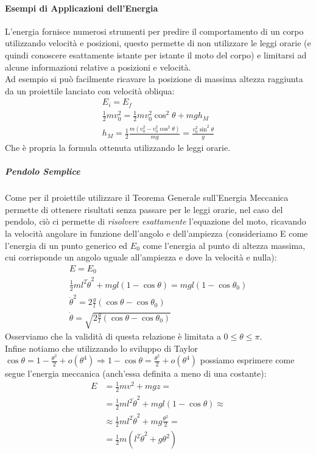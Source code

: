 \documentclass{report}
\newcommand{\then}{\ensuremath{\Rightarrow}}
\begin{document}
\paragraph{Esempi di Applicazioni dell'Energia}
L'energia fornisce numerosi strumenti per predire il comportamento di un corpo utilizzando velocità e posizioni, questo permette di non utilizzare le leggi orarie (e quindi conoscere esattamente istante per istante il moto del corpo) e limitarsi ad alcune informazioni relative a posizioni e velocità.\\
Ad esempio si può facilmente ricavare la posizione di massima altezza raggiunta da un proiettile lanciato con velocità obliqua:
\begin{align*}
    E_i=E_f\\
    \frac{1}{2}mv_0^2=\frac{1}{2}mv_0^2\cos^2\theta+mgh_M\\
    h_M=\frac{1}{2}\frac{m(v_0^2-v_0^2\cos^2\theta)}{mg}=\frac{v_0^2\sin^2\theta}{g}
\end{align*}
Che è propria la formula ottenuta utilizzando le leggi orarie.
\subparagraph{Pendolo Semplice}
Come per il proiettile utilizzare il Teorema Generale sull'Energia Meccanica permette di ottenere risultati senza passare per le leggi orarie, nel caso del pendolo, ciò ci permette di \textit{risolvere esattamente} l'equazione del moto, ricavando la velocità angolare in funzione dell'angolo e dell'ampiezza (consideriamo E come l'energia di un punto generico ed $E_0$ come l'energia al punto di altezza massima, cui corrisponde un angolo uguale all'ampiezza e dove la velocità e nulla):
\begin{align*}
    E=E_0\\
    \frac{1}{2}ml^2\Dot{\theta}^2+mgl(1-\cos\theta)=mgl(1-\cos\theta_0)\\
    \Dot{\theta}^2=2\frac{g}{l}(\cos\theta-\cos\theta_0)\\
    \boxed{\Dot{\theta}=\sqrt{2\frac{g}{l}(\cos\theta-\cos\theta_0)}}
\end{align*}
Osserviamo che la validità di questa relazione è limitata a $0\leq\theta\leq\pi$.\\
Infine notiamo che utilizzando lo sviluppo di Taylor $\cos\theta=1-\frac{\theta^2}{2}+o(\theta^4)\then 1-\cos\theta=\frac{\theta^2}{2}+o(\theta^4)$ possiamo esprimere come segue l'energia meccanica (anch'essa definita a meno di una costante):
\begin{equation}
\begin{split}
    E&=\frac{1}{2}mv^2+mgz=\\
    &=\frac{1}{2}ml^2\Dot{\theta}^2+mgl(1-\cos\theta)\approx\\
    &\approx\frac{1}{2}ml^2\Dot{\theta}^2+mg\frac{\theta^2}{2}=\\
    &=\boxed{\frac{1}{2}m(l^2\Dot{\theta}^2+g\theta^2)}
\end{split}
\end{equation}
\end{document}
